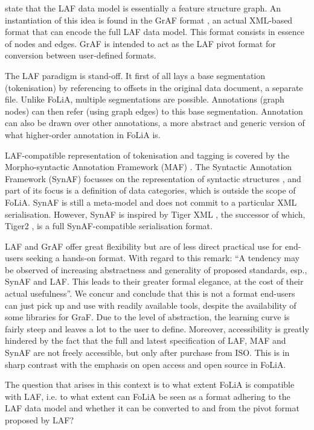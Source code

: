\documentclass[a4paper,10pt,twoside]{article}
\begin{document}
 state that the LAF data model is essentially a feature
structure graph. An instantiation of this idea is found in the GrAF format
\cite{GRAF}, an actual XML-based format that can encode the full LAF data
model. This format consists in essence of nodes and edges. GrAF is intended to
act as the LAF pivot format for conversion between user-defined formats. 

The LAF paradigm is stand-off. It first of all lays a base segmentation
(tokenisation) by referencing to offsets in the original data document, a
separate file. Unlike FoLiA, multiple segmentations are possible. Annotations
(graph nodes) can then refer (using graph edges) to this base segmentation.
Annotation can also be drawn over other annotations, a more abstract and
generic version of what higher-order annotation in FoLiA is.

LAF-compatible representation of tokenisation and tagging is covered by the
Morpho-syntactic Annotation Framework (MAF) \cite{MAF}. The Syntactic
Annotation Framework (SynAF) focusses on the representation of syntactic
structures \cite{SYNAF}, and part of its focus is a definition of data
categories, which is outside the scope of FoLiA. SynAF is still a meta-model
and does not commit to a particular XML serialisation. However, SynAF is
inspired by Tiger XML \cite{TIGER}, the successor of which, Tiger2
\cite{TIGER2}, is a full SynAF-compatible serialisation format.

LAF and GrAF offer great flexibility but are of less direct practical use for
end-users seeking a hands-on format. With regard to this
 remark: ``A tendency may be observed of increasing
abstractness and generality of proposed standards, esp., SynAF and LAF. This
leads to their greater formal elegance, at the cost of their actual
usefulness''. We concur and conclude that this is not a format end-users can
just pick up and use with readily available tools, despite the availability of
some libraries for GraF. Due to the level of abstraction, the learning curve is
fairly steep and leaves a lot to the user to define. Moreover, accessibility is
greatly hindered by the fact that the full and latest specification of LAF, MAF
and SynAF are not freely accessible, but only after purchase from ISO.  This is in sharp contrast with the emphasis on open access and open source in FoLiA. 

The question that arises in this context is to what extent FoLiA is compatible
with LAF, i.e. to what extent can FoLiA be seen as a format adhering to the LAF
data model and whether it can be converted to and from the pivot format proposed by LAF?
\end{document}
